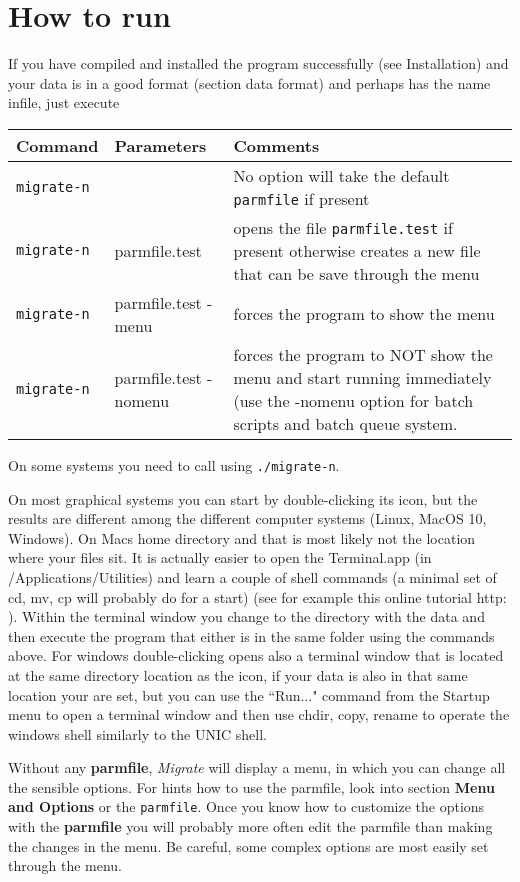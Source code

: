 \chapter{How to run \migrate}
If you have compiled and installed the program successfully (see Installation) and your data is in a good format (section data format) and perhaps has the name infile, just execute
\smallerskip
\begin{tabular}{l l p{10cm}}
Command & Parameters & Comments\\
\hline
{\tt migrate-n} &  & No option will take the default {\tt parmfile} if present\\
{\tt migrate-n} &  parmfile.test & opens the file {\tt parmfile.test} if present otherwise creates a new file that can be save through the menu\\
{\tt migrate-n} &  parmfile.test -menu & forces the program to show the menu\\
{\tt migrate-n} &  parmfile.test -nomenu & forces the program to NOT show the menu and start running immediately (use the -nomenu option for batch scripts and batch queue system.
\end{tabular}

On some systems you need to call \migrate using {\tt ./migrate-n}.

\smallerskip
On most graphical systems you can start \migrate by double-clicking its icon, but the results are different among the different computer systems (Linux, MacOS 10, Windows). On Macs home directory and that is most likely not the location where your files sit. It is actually easier to open the Terminal.app (in /Applications/Utilities) and 
learn a couple of shell commands (a minimal set of cd, mv, cp will probably do for a start) (see for example this online tutorial http: ). Within the terminal window you change to the directory with the data and then execute the program that either is in the same folder using the commands above. For windows double-clicking opens also a terminal window that is located at the same directory location as the icon, if your data is also in that same location your are set, but you can use the ``Run..." command from the Startup menu to open a terminal window and then use chdir, copy, rename to operate the windows shell similarly to the UNIC shell.

Without any {\bf parmfile}, {\it Migrate} will display a menu, in which you can change all the sensible options. For hints how to use the parmfile, look into section {\bf Menu and Options} or the {\tt parmfile}. Once you know how to customize the options with the {\bf parmfile} you will probably more often
edit the parmfile than making the changes in the menu. Be careful, some complex options are most easily set through the menu.




